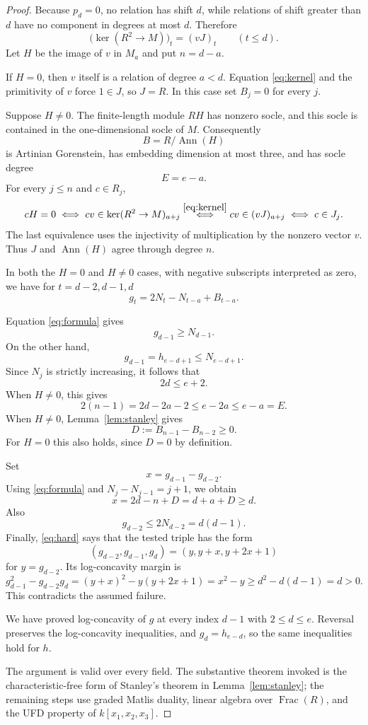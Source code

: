 \documentclass[11pt]{article}
\begin{document}
\begin{proof}
Because $p_d=0$, no relation has shift $d$, while relations of shift
greater than $d$ have no component in degrees at most $d$.  Therefore
\begin{equation}
\label{eq:kernel}
  \bigl(\ker(R^2\to M)\bigr)_t=(vJ)_t
  \qquad(t\leq d).
\end{equation}
Let $H$ be the image of $v$ in $M_a$ and put $n=d-a$.

If $H=0$, then $v$ itself is a relation of degree $a<d$.
Equation \eqref{eq:kernel} and the primitivity of $v$ force
$1\in J$, so $J=R$.  In this case set $B_j=0$ for every $j$.

Suppose $H\neq0$.  The finite-length module $RH$ has nonzero socle,
and this socle is contained in the one-dimensional socle of $M$.
Consequently
\[
  B=R/\operatorname{Ann}(H)
\]
is Artinian Gorenstein, has embedding dimension at most three, and has
socle degree
\[
  E=e-a.
\]
For every $j\leq n$ and $c\in R_j$,
\[
  cH=0
  \iff cv\in\ker(R^2\to M)_{a+j}
  \overset{\eqref{eq:kernel}}{\iff}cv\in(vJ)_{a+j}
  \iff c\in J_j.
\]
The last equivalence uses the injectivity of multiplication by the
nonzero vector $v$.  Thus $J$ and $\operatorname{Ann}(H)$ agree
through degree $n$.

In both the $H=0$ and $H\neq0$ cases, with negative subscripts
interpreted as zero, we have for $t=d-2,d-1,d$
\begin{equation}
\label{eq:formula}
  g_t=2N_t-N_{t-a}+B_{t-a}.
\end{equation}

Equation \eqref{eq:formula} gives
\[
  g_{d-1}\geq N_{d-1}.
\]
On the other hand,
\[
  g_{d-1}=h_{e-d+1}\leq N_{e-d+1}.
\]
Since $N_j$ is strictly increasing, it follows that
\begin{equation}
\label{eq:location}
  2d\leq e+2.
\end{equation}
When $H\neq0$, this gives
\[
  2(n-1)=2d-2a-2
  \leq e-2a
  \leq e-a=E.
\]
When $H\neq0$, Lemma~\ref{lem:stanley} gives
\[
  D:=B_{n-1}-B_{n-2}\geq0.
\]
For $H=0$ this also holds, since $D=0$ by definition.

Set
\[
  x=g_{d-1}-g_{d-2}.
\]
Using \eqref{eq:formula} and
$N_j-N_{j-1}=j+1$, we obtain
\[
  x=2d-n+D=d+a+D\geq d.
\]
Also
\[
  g_{d-2}\leq2N_{d-2}=d(d-1).
\]
Finally, \eqref{eq:hard} says that the tested triple has the form
\[
  (g_{d-2},g_{d-1},g_d)
  =(y,y+x,y+2x+1)
\]
for $y=g_{d-2}$.  Its log-concavity margin is
\[
  g_{d-1}^2-g_{d-2}g_d
  =(y+x)^2-y(y+2x+1)
  =x^2-y
  \geq d^2-d(d-1)
  =d>0.
\]
This contradicts the assumed failure.

We have proved log-concavity of $g$ at every index $d-1$ with
$2\leq d\leq e$.  Reversal preserves the log-concavity inequalities,
and $g_d=h_{e-d}$, so the same inequalities hold for $h$.

The argument is valid over every field.  The substantive theorem
invoked is the characteristic-free form of Stanley's theorem in
Lemma~\ref{lem:stanley}; the remaining steps use graded Matlis
duality, linear algebra over $\operatorname{Frac}(R)$, and the UFD
property of $k[x_1,x_2,x_3]$.
\end{proof}
\end{document}
